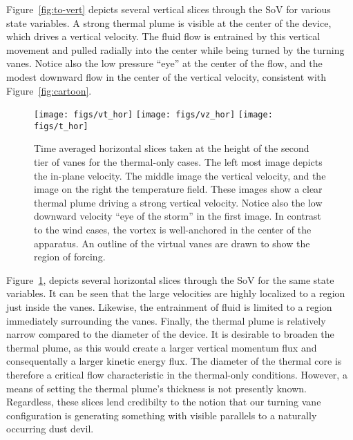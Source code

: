 %
%
%
Figure~\ref{fig:to-vert} depicts several vertical slices through the SoV
for various state variables. A strong thermal plume is visible at the
center of the device, which drives a vertical velocity. The fluid flow
is entrained by this vertical movement and pulled radially into the
center while being turned by the turning vanes. Notice also the low
pressure ``eye'' at the center of the flow, and the modest downward flow
in the center of the vertical velocity, consistent with
Figure~\ref{fig:cartoon}. 

\begin{figure}[htb]

 \centering
  \texttt{[image: figs/vt\_hor]}
 \hfill
  \texttt{[image: figs/vz\_hor]}
 \hfill
  \texttt{[image: figs/t\_hor]}
 \caption{Time averaged horizontal slices taken at the height of the
 second tier of vanes for the thermal-only cases. The left most image
 depicts the in-plane velocity. The middle image the vertical velocity,
 and the image on the right the temperature field. These images show a
 clear thermal plume driving a strong vertical velocity. Notice also the
 low downward velocity ``eye of the storm'' in the first image. In
 contrast to the wind cases, the vortex is well-anchored in the center
 of the apparatus. An outline of the virtual vanes are drawn to show the
 region of forcing.}
 \label{fig:to-hor}
\end{figure}

Figure~\ref{fig:to-hor}, depicts several horizontal slices
through the SoV for the same state variables. It can be seen that the
large velocities are highly localized to a region just inside the
vanes. Likewise, the entrainment of fluid is limited to a region
immediately surrounding the vanes. 
%
%
Finally, the thermal plume is relatively narrow compared to the diameter
of the device. It is desirable to broaden the thermal plume, as this
would create a larger vertical momentum flux and consequentally a larger
kinetic energy flux.  
The diameter of the thermal core is therefore a critical flow
characteristic in the thermal-only conditions. However, a means of
setting the thermal plume's thickness is not presently 
known. Regardless, these slices lend credibilty to the 
notion that our turning vane configuration is generating something with
visible parallels to a naturally occurring dust devil.   

